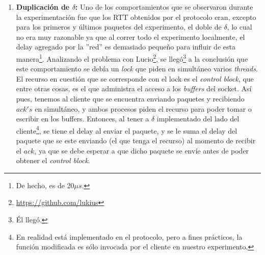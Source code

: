 \begin{enumerate}[label=(\alph*)]
        \par Para solucionar este ''inconveniente'', se podr\'ia
        trabajar con el reloj de mayor precisi\'on del sistema operativo,
        para lo cual hubiera sido necesario modificar el protocolo o implementar
        alg\'un mecanismo para utilizarlo\footnote{Utilizando los \emph{payloads
        de los paquetes quiz\'as}.}. Pero se consider\'o que estos cambios no
        terminari\'an siendo necesarios, ya que en los casos de mayor inter\'es
        (aquellos donde $\delta$ y $\phi$ tienen mayor relevancia), estos 10ms
        de m\'as que pueden aparecer en algunos paquetes tendr\'an muy poca
        influencia en el an\'alisis global.

    \bigskip
    \item \textbf{Duplicaci\'on de $\delta$:} Uno de los comportamientos que se
        observaron durante la experimentaci\'on fue que los RTT obtenidos por el
        protocolo eran, excepto para los primeros y \'ultimos paquetes del
        experimento, el doble de $\delta$, lo cual no era muy razonable ya que
        al correr todo el experimento localmente, el delay agregado por la
        ''red'' es demasiado peque\~no para influir de esta manera\footnote{De
        hecho, es de 20$\mu s$.}. Analizando el problema con
        Lucio\footnote{\url{https://github.com/lukius}}, se
        lleg\'o\footnote{\'El lleg\'o.} a la conclusi\'on que este
        comportamiento se deb\'ia un \emph{lock} que piden en simult\'aneo
        varios \emph{threads}. El recurso en cuesti\'on que se corresponde con
        el lock es el \emph{control block}, que entre otras cosas, es el que
        administra el acceso a los \emph{buffers} del socket. As\'i pues,
        tenemos al cliente que se encuentra enviando paquetes y recibiendo
        $ack's$ en simult\'aneo, y ambos procesos piden el recurso para poder
        tomar o escribir en los buffers. Entonces, al tener a $\delta$
        implementado del lado del cliente\footnote{En realidad est\'a
        implementado en el protocolo, pero a fines pr\'acticos, la funci\'on
        modificada es s\'olo invocada por el cliente en nuestro experimento.},
        se tiene el delay al enviar el paquete, y se le suma el delay del
        paquete que se este enviando (el que tenga el recurso) al momento de
        recibir el $ack$, ya que se debe esperar a que dicho paquete se env\'ie
        antes de poder obtener el \emph{control block}.


\end{enumerate}
